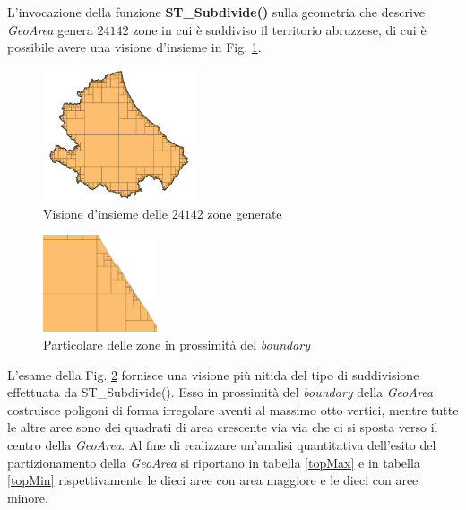 L'invocazione della funzione \textbf{ST\_Subdivide()} sulla geometria che descrive \textit{GeoArea} genera $24142$ zone in cui è suddiviso il territorio abruzzese, di cui è possibile avere una visione d'insieme in Fig. \ref{nostrodataset}.
\begin{figure}[h]
\centering
\includegraphics[width=0.4\textwidth]{img/nostrodataset}
\caption{Visione d'insieme delle $24142$ zone generate}
\label{nostrodataset}
\end{figure}
\begin{figure}[h]
\centering
\includegraphics[width=0.3\textwidth]{img/bordo}
\caption{Particolare delle zone in prossimità del \textit{boundary}}
\label{bordo}
\end{figure}
L'esame della Fig. \ref{bordo} fornisce una visione più nitida del tipo di suddivisione effettuata da ST\_Subdivide(). Esso in prossimità del \textit{boundary} della \textit{GeoArea} costruisce poligoni di forma irregolare aventi al massimo otto vertici, mentre tutte le altre aree sono dei quadrati di area crescente via via che ci si sposta verso il centro della \textit{GeoArea}.
Al fine di realizzare un'analisi quantitativa dell'esito del partizionamento della \textit{GeoArea} si riportano in tabella \ref{topMax} e in tabella \ref{topMin} rispettivamente le dieci aree con area maggiore e le dieci con aree minore.

